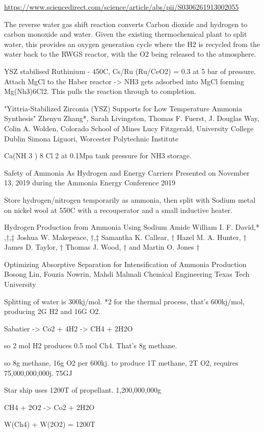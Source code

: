 \documentclass[10pt]{article}
\begin{document}
\url{https://www.sciencedirect.com/science/article/abs/pii/S0306261913002055}

The reverse water gas shift reaction converts Carbon dioxide and hydrogen to carbon monoxide and water. Given the existing thermochemical plant to split water, this provides an oxygen generation cycle where the H2 is recycled from the water back to the RWGS reactor, with the O2 being released to the atmosphere.


YSZ stabilised Ruthinium - 450C, Cs/Ru (Ru/CeO2) = 0.3 at 5 bar of pressure. Attach MgCl to the Haber reactor -> NH3 gets adsorbed into MgCl forming Mg(Nh3)6Cl2. This pulls the reaction through to completion.

"Yittria-Stabilized Zirconia (YSZ) Supports for Low Temperature Ammonia Synthesis"  Zhenyu Zhang*, Sarah Livingston, Thomas F. Fuerst, J. Douglas Way, Colin A. Wolden, Colorado School of Mines
Lucy Fitzgerald, University College Dublin
Simona Liguori, Worcester Polytechnic Institute

Ca(NH 3 ) 8 Cl 2 at 0.1Mpa tank pressure for NH3 storage.

Safety of Ammonia As Hydrogen and Energy Carriers
Presented on November 13, 2019 during the Ammonia Energy Conference 2019 

Store hydrogen/nitrogen temporarily as ammonia, then split with Sodium metal on nickel wool at 550C with a recouperator and a small inductive heater.

Hydrogen Production from Ammonia Using Sodium Amide
William I. F. David,* ,†,‡ Joshua W. Makepeace, †,‡ Samantha K. Callear, † Hazel M. A. Hunter, †
James D. Taylor, † Thomas J. Wood, † and Martin O. Jones †


Optimizing Absorptive Separation for
Intensification of Ammonia Production
Bosong Lin, Fouzia Nowrin, Mahdi Malmali
Chemical Engineering
Texas Tech University

Splitting of water is 300kj/mol. *2 for the thermal process, that's 600kj/mol, producing 2G H2 and 16G O2. 

Sabatier -> Co2 + 4H2 -> CH4 + 2H2O

so 2 mol H2 produces 0.5 mol Ch4. That's 8g methane.

so 8g methane, 16g O2 per 600kj. 
to produce 1T methane, 2T O2, requires 75,000,000,000j.  75GJ

Star ship uses 1200T of propellant. 1,200,000,000g

CH4 + 2O2 -> Co2 + 2H2O

W(Ch4) + W(2O2) = 1200T
\end{document}
